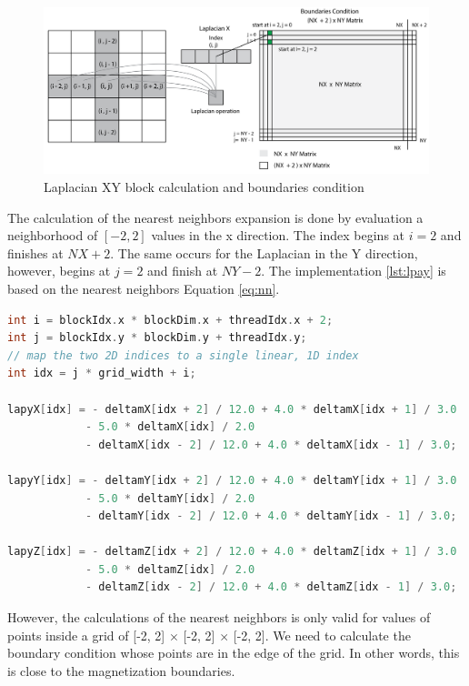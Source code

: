 \begin{figure}[htbp]
	\centering
		\includegraphics[width=1.0\textwidth]{Figures/laplacian.png}
		\smallskip
	\caption[Laplacian block calculation]{Laplacian XY block calculation and boundaries condition}
	\label{fig:laplacian}
\end{figure}

The calculation of the nearest neighbors expansion is done by evaluation a neighborhood of $[-2, 2]$ values in the x direction. The index begins at $i = 2$ and finishes at $NX + 2$. The same occurs for the Laplacian in the Y direction, however, begins at $j = 2$ and finish at $NY -2$.  The implementation \ref{lst:lpay} is based on the nearest neighbors Equation \ref{eq:nn}.

\begin{lstlisting}[language=C++, label={lst:lpay}, caption={Laplacian evaluation for x, y and z coordinate}]
int i = blockIdx.x * blockDim.x + threadIdx.x + 2;
int j = blockIdx.y * blockDim.y + threadIdx.y;
// map the two 2D indices to a single linear, 1D index
int idx = j * grid_width + i;

lapyX[idx] = - deltamX[idx + 2] / 12.0 + 4.0 * deltamX[idx + 1] / 3.0
			- 5.0 * deltamX[idx] / 2.0
			- deltamX[idx - 2] / 12.0 + 4.0 * deltamX[idx - 1] / 3.0;	
			
lapyY[idx] = - deltamY[idx + 2] / 12.0 + 4.0 * deltamY[idx + 1] / 3.0
			- 5.0 * deltamY[idx] / 2.0
			- deltamY[idx - 2] / 12.0 + 4.0 * deltamY[idx - 1] / 3.0;	
			
lapyZ[idx] = - deltamZ[idx + 2] / 12.0 + 4.0 * deltamZ[idx + 1] / 3.0
			- 5.0 * deltamZ[idx] / 2.0
			- deltamZ[idx - 2] / 12.0 + 4.0 * deltamZ[idx - 1] / 3.0;	
\end{lstlisting}


However, the calculations of the nearest neighbors is only valid for values of points inside a grid of [-2, 2] $\times$ [-2, 2] $\times$ [-2, 2]. We need to calculate the boundary condition whose points are in the edge of the grid. In other words, this is close to the magnetization boundaries.

